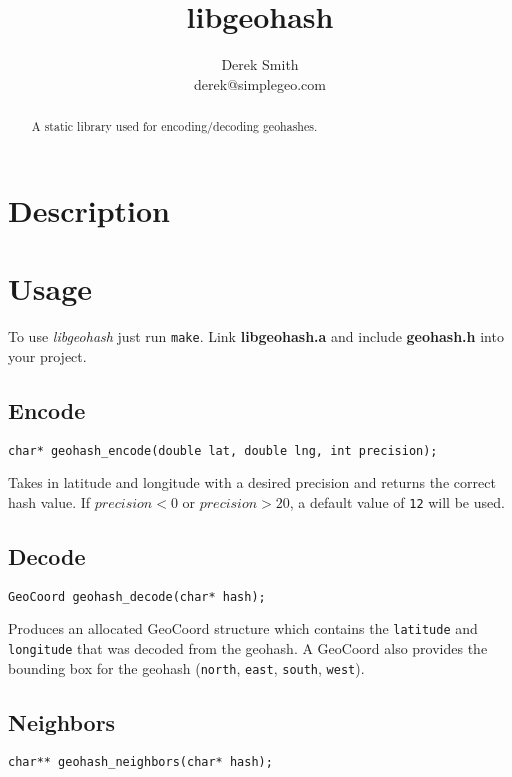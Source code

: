 \documentclass{article}
\title{libgeohash}
\author{Derek Smith \\ derek@simplegeo.com}
\begin{document}
\maketitle

\begin{abstract}
A static library used for encoding/decoding geohashes.
\end{abstract}

\section{Description}

\section{Usage}

To use \textit{libgeohash} just run \texttt{make}. Link \textbf{libgeohash.a} and include \textbf{geohash.h} into your project.

\subsection{Encode}
\begin{verbatim}
char* geohash_encode(double lat, double lng, int precision);
\end{verbatim}

Takes in latitude and longitude with a desired precision and returns the correct hash value. If
\(precision < 0\) or \(precision > 20\), a default value of \texttt{12} will be used.

\subsection{Decode}
\begin{verbatim}
GeoCoord geohash_decode(char* hash);
\end{verbatim}

Produces an allocated GeoCoord structure which contains the \texttt{latitude} and \texttt{longitude} that was decoded from
the geohash. A GeoCoord also provides the bounding box for the geohash (\texttt{north}, \texttt{east}, \texttt{south}, \texttt{west}).

\subsection{Neighbors}
\begin{verbatim}
char** geohash_neighbors(char* hash);
\end{verbatim}
\end{document}
